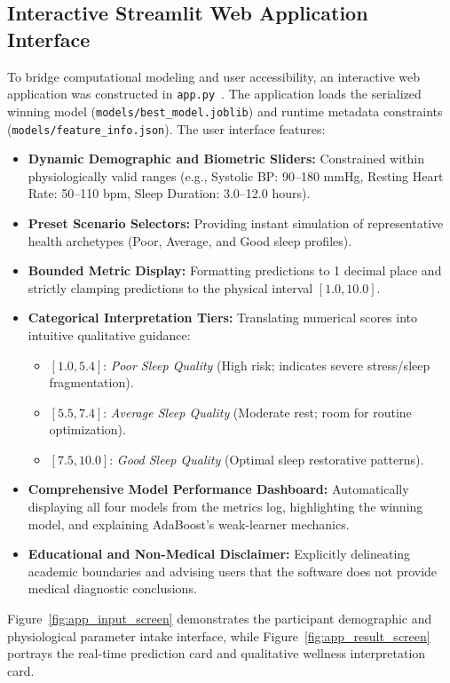 \documentclass[12pt,a4paper]{article}
\begin{document}
\subsection{Interactive Streamlit Web Application Interface}
To bridge computational modeling and user accessibility, an interactive web application was constructed in \texttt{app.py}~\cite{streamlit}. The application loads the serialized winning model (\texttt{models/best\_model.joblib}) and runtime metadata constraints (\texttt{models/feature\_info.json}). The user interface features:
\begin{itemize}
    \item \textbf{Dynamic Demographic and Biometric Sliders:} Constrained within physiologically valid ranges (e.g., Systolic BP: 90--180 mmHg, Resting Heart Rate: 50--110 bpm, Sleep Duration: 3.0--12.0 hours).
    \item \textbf{Preset Scenario Selectors:} Providing instant simulation of representative health archetypes (Poor, Average, and Good sleep profiles).
    \item \textbf{Bounded Metric Display:} Formatting predictions to 1 decimal place and strictly clamping predictions to the physical interval $[1.0, 10.0]$.
    \item \textbf{Categorical Interpretation Tiers:} Translating numerical scores into intuitive qualitative guidance:
    \begin{itemize}
        \item $[1.0, 5.4]$: \textit{Poor Sleep Quality} (High risk; indicates severe stress/sleep fragmentation).
        \item $[5.5, 7.4]$: \textit{Average Sleep Quality} (Moderate rest; room for routine optimization).
        \item $[7.5, 10.0]$: \textit{Good Sleep Quality} (Optimal sleep restorative patterns).
    \end{itemize}
    \item \textbf{Comprehensive Model Performance Dashboard:} Automatically displaying all four models from the metrics log, highlighting the winning model, and explaining AdaBoost's weak-learner mechanics.
    \item \textbf{Educational and Non-Medical Disclaimer:} Explicitly delineating academic boundaries and advising users that the software does not provide medical diagnostic conclusions.
\end{itemize}

Figure~\ref{fig:app_input_screen} demonstrates the participant demographic and physiological parameter intake interface, while Figure~\ref{fig:app_result_screen} portrays the real-time prediction card and qualitative wellness interpretation card.
\end{document}
